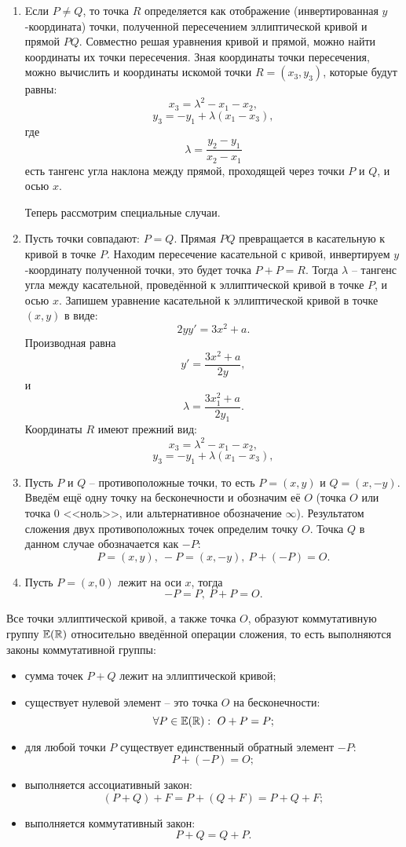 \begin{enumerate}
    \item Eсли $P \neq Q$, то точка $R$ определяется как отображение (инвертированная $y$-координата) точки, полученной пересечением эллиптической кривой и прямой $PQ$. Совместно решая уравнения кривой и прямой, можно найти координаты их точки пересечения. Зная координаты точки пересечения, можно вычислить и координаты искомой точки $R = (x_3, y_3)$, которые будут равны:
        \[ x_3 = \lambda^2 - x_1 - x_2, \]
        \[ y_3 = - y_1 + \lambda (x_1 - x_3), \]
где
        \[ \lambda = \frac{y_2 - y_1}{x_2 - x_1} \]
есть тангенс угла наклона между прямой, проходящей через точки $P$ и $Q$, и осью $x$.

	Теперь рассмотрим специальные случаи.
    \item Пусть точки совпадают: $P = Q$. Прямая $PQ$ превращается в касательную к кривой в точке $P$. Находим пересечение касательной с кривой, инвертируем $y$-координату полученной точки, это будет точка $P + P = R$. Тогда $\lambda$ -- тангенс угла между касательной, проведённой к эллиптической кривой в точке $P$, и осью $x$. Запишем уравнение касательной к эллиптической кривой в точке $(x,y)$ в виде:
            \[ 2 y y' = 3 x^2 + a. \]
        Производная равна
            \[ y' = \frac{3 x^2 + a}{2 y}, \]
        и
            \[ \lambda = \frac{3 x_1^2 + a}{2 y_1}. \]
        Координаты $R$ имеют прежний вид:
            \[ x_3 = \lambda^2 - x_1 - x_2, \]
            \[ y_3 = - y_1 + \lambda (x_1 - x_3), \]
    \item Пусть $P$ и $Q$ -- противоположные точки, то есть $P=(x,y)$ и $Q=(x, -y)$. Введём ещё одну точку на бесконечности и обозначим её $O$ (точка $O$ или точка 0 <<ноль>>, или альтернативное обозначение $\infty$). Результатом сложения двух противоположных точек определим точку $O$. Точка $Q$ в данном случае обозначается как $-P$:
        \[ P = (x,y), ~ -P = (x, -y), ~ P + (-P) = O. \]
    \item Пусть $P = (x, 0)$ лежит на оси $x$, тогда
        \[ -P = P, ~ P + P = O. \]
\end{enumerate}

Все точки эллиптической кривой, а также точка $O$, образуют коммутативную группу $\mathbb{E}(\mathbb{R})$ относительно введённой операции сложения, то есть выполняются законы коммутативной группы:
\begin{itemize}
    \item сумма точек $P + Q$ лежит на эллиптической кривой;
    \item существует нулевой элемент -- это точка $O$ на бесконечности:
        \[ \forall P \in \mathbb{E}(\mathbb{R}): ~ O + P = P; \]
    \item для любой точки $P$ существует единственный обратный элемент $-P$:
        \[ P + (-P) = O; \]
    \item выполняется ассоциативный закон:
        \[ (P + Q) + F = P + (Q + F) = P + Q + F; \]
    \item выполняется коммутативный закон:
        \[ P + Q = Q + P. \]
\end{itemize}

